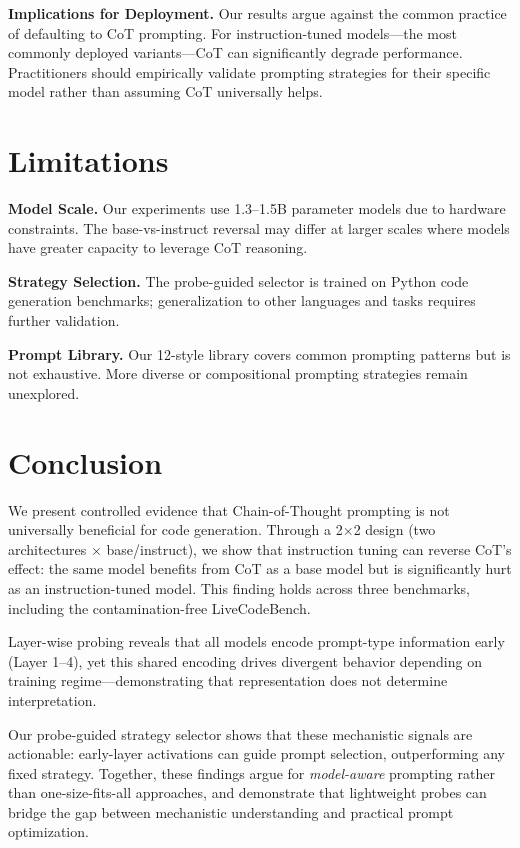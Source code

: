 \documentclass{article}
\begin{document}
\textbf{Implications for Deployment.} Our results argue against the common practice of defaulting to CoT prompting. For instruction-tuned models---the most commonly deployed variants---CoT can significantly degrade performance. Practitioners should empirically validate prompting strategies for their specific model rather than assuming CoT universally helps.

\section{Limitations}

\textbf{Model Scale.} Our experiments use 1.3--1.5B parameter models due to hardware constraints. The base-vs-instruct reversal may differ at larger scales where models have greater capacity to leverage CoT reasoning.

\textbf{Strategy Selection.} The probe-guided selector is trained on Python code generation benchmarks; generalization to other languages and tasks requires further validation.

\textbf{Prompt Library.} Our 12-style library covers common prompting patterns but is not exhaustive. More diverse or compositional prompting strategies remain unexplored.

\section{Conclusion}

We present controlled evidence that Chain-of-Thought prompting is not universally beneficial for code generation. Through a 2$\times$2 design (two architectures $\times$ base/instruct), we show that instruction tuning can reverse CoT's effect: the same model benefits from CoT as a base model but is significantly hurt as an instruction-tuned model. This finding holds across three benchmarks, including the contamination-free LiveCodeBench.

Layer-wise probing reveals that all models encode prompt-type information early (Layer 1--4), yet this shared encoding drives divergent behavior depending on training regime---demonstrating that representation does not determine interpretation.

Our probe-guided strategy selector shows that these mechanistic signals are actionable: early-layer activations can guide prompt selection, outperforming any fixed strategy. Together, these findings argue for \emph{model-aware} prompting rather than one-size-fits-all approaches, and demonstrate that lightweight probes can bridge the gap between mechanistic understanding and practical prompt optimization.



\end{document}

